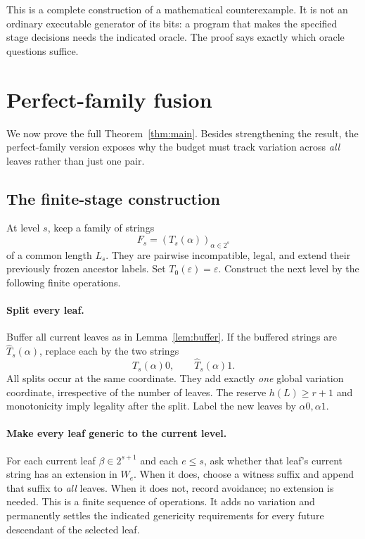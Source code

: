 \documentclass[11pt,a4paper]{article}
\newcommand{\emptystr}{\varepsilon}
\theoremstyle{definition}\newtheorem{definition}[theorem]{Definition}
\theoremstyle{remark}\newtheorem{remark}[theorem]{Remark}
\begin{document}
This is a complete construction of a mathematical counterexample. It is not
an ordinary executable generator of its bits: a program that makes the
specified stage decisions needs the indicated oracle. The proof says exactly
which oracle questions suffice.

\section{Perfect-family fusion}
\label{sec:perfect}

We now prove the full Theorem~\ref{thm:main}. Besides strengthening the result,
the perfect-family version exposes why the budget must track variation across
\emph{all} leaves rather than just one pair.

\subsection{The finite-stage construction}
At level $s$, keep a family of strings
\[
             F_s=(T_s(\alpha))_{\alpha\in2^s}
\]
of a common length $L_s$. They are pairwise incompatible, legal, and extend
their previously frozen ancestor labels. Set
$T_0(\emptystr)=\emptystr$.
Construct the next level by the following finite operations.

\paragraph{Split every leaf.}
Buffer all current leaves as in Lemma~\ref{lem:buffer}. If the buffered
strings are $\widehat T_s(\alpha)$, replace each by the two strings
\[
       \widehat T_s(\alpha)0,\qquad\widehat T_s(\alpha)1.
\]
All splits occur at the same coordinate. They add exactly \emph{one} global
variation coordinate, irrespective of the number of leaves. The reserve
$h(L)\ge r+1$ and monotonicity imply legality after the split.
Label the new leaves by $\alpha0,\alpha1$.

\paragraph{Make every leaf generic to the current level.}
For each current leaf $\beta\in2^{s+1}$ and each $e\le s$, ask whether that
leaf's current string has an extension in $W_e$. When it does, choose a
witness suffix and append that suffix to \emph{all} leaves. When it does not,
record avoidance; no extension is needed. This is a finite sequence of
operations. It adds no variation and permanently settles the indicated
genericity requirements for every future descendant of the selected leaf.
\end{document}
